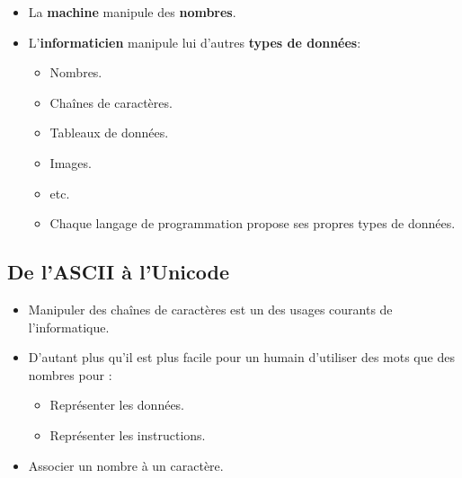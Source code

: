 \begin{slide}
	\begin{itemize}
		\item La \textbf{machine} manipule des \textbf{nombres}.
		\item L'\textbf{informaticien} manipule lui d'autres \textbf{types de données}:
		\begin{itemize}
			\item Nombres.
			\item Chaînes de caractères.
			\item Tableaux de données.
			\item Images.
			\item etc. 
			\item Chaque langage de programmation propose ses propres types de données.
		\end{itemize}
	\end{itemize}
\end{slide}

\subsection{De l'ASCII à l'Unicode}
\begin{slide}
	\begin{itemize}
		\item Manipuler des chaînes de caractères est un des usages courants de l'informatique.
		\item D'autant plus qu'il est plus facile pour un humain d'utiliser des mots que des nombres pour :
			\begin{itemize}
				\item Représenter les données.
				\item Représenter les instructions.
			\end{itemize}
		\item Associer un nombre à un caractère.
	\end{itemize}
\end{slide}

